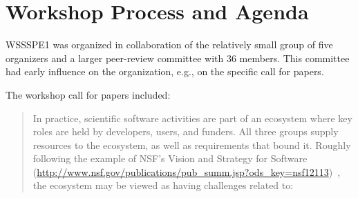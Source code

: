 \documentclass[11pt, oneside]{amsart}
\begin{document}
\section{Workshop Process and Agenda} \label{sec:process}

WSSSPE1 was organized in collaboration of the relatively small group
of five organizers and a larger peer-review committee with 36
members. This committee had early influence on the organization, e.g.,
on the specific call for papers.

The workshop call for papers included:

\begin{quote}
In practice, scientific software activities are part of an ecosystem
where key roles are held by developers, users, and funders. All three
groups supply resources to the ecosystem, as well as requirements that
bound it. Roughly following the example of NSF's Vision and Strategy
for Software
(\url{http://www.nsf.gov/publications/pub_summ.jsp?ods_key=nsf12113})~\cite{NSF_software_vision},
the ecosystem may be viewed as having challenges related to:


\end{quote}
\end{document}
